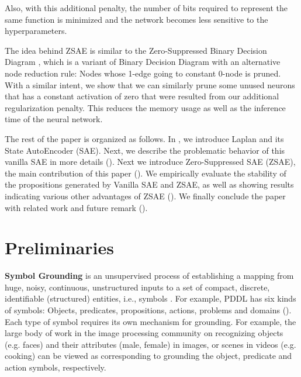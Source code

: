 Also, with this additional penalty, the number of bits required to represent the same function
is minimized and the network becomes less sensitive to the hyperparameters.

The idea behind ZSAE is similar to the Zero-Suppressed Binary Decision Diagram \cite{minato1993zero},
which is a variant of Binary Decision Diagram \cite{bryant1986graph} with an alternative node reduction rule:
Nodes whose 1-edge going to constant 0-node is pruned.
With a similar intent, we show that we can similarly prune some unused neurons
that has a constant activation of zero
that were resulted from our additional regularization penalty.
This reduces the memory usage as well as the inference time of the neural network.

The rest of the paper is organized as follows.
In , we introduce Laplan \cite{Asai2018} and its State AutoEncoder (SAE).
Next, we describe the problematic behavior of this vanilla SAE in more details ().
Next we introduce Zero-Suppressed SAE (ZSAE), the main contribution of this paper ().
We empirically evaluate the stability of the propositions generated by Vanilla SAE and ZSAE,
as well as showing results indicating various other advantages of ZSAE ().
We finally conclude the paper with related work and future remark ().


\section{Preliminaries}
\label{background}

\textbf{Symbol Grounding} is an unsupervised process of establishing a mapping
from huge, noisy, continuous, unstructured inputs
to a set of compact, %
discrete, identifiable (structured) entities, i.e., symbols \cite{Asai2018}.
For example, PDDL has six kinds of symbols: Objects, predicates, propositions, actions, problems and domains ().
Each type of symbol requires its own mechanism for grounding.
For example, the large body of work in the image processing community on recognizing 
objects (e.g. faces) and their attributes (male, female) in images, or scenes in videos (e.g. cooking)
can be viewed as corresponding to grounding the object, predicate and action symbols, respectively.

